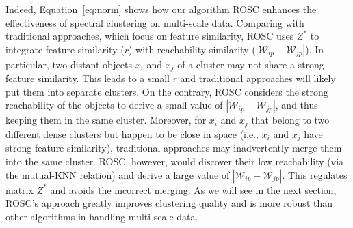 Indeed, Equation~\ref{eq:norm} shows how our algorithm ROSC enhances the effectiveness of 
spectral clustering on multi-scale data. 
Comparing with traditional approaches, which focus on feature similarity, ROSC uses $Z^*$
to integrate feature similarity  ($r$) with
reachability similarity ($|\mathcal{W}_{ip}-\mathcal{W}_{jp}|$).
In particular, two distant objects $x_i$ and $x_j$ of a cluster may not share a strong feature similarity.
This leads to a small $r$ and traditional approaches will likely put them into separate clusters.
On the contrary, ROSC considers the strong reachability of the objects
to derive a small value of $|\mathcal{W}_{ip}-\mathcal{W}_{jp}|$, and thus keeping them in the same cluster.
Moreover, for $x_i$ and $x_j$ that belong to two different dense clusters but happen to be close in 
space (i.e., $x_i$ and $x_j$ have strong feature similarity), 
traditional approaches may inadvertently merge them into the same cluster. 
ROSC, however, would discover their low reachability (via the mutual-KNN relation)
and derive a large value of $|\mathcal{W}_{ip}-\mathcal{W}_{jp}|$.
This regulates matrix $Z^*$ and avoids the incorrect merging.
As we will see in the next section, ROSC's approach 
greatly improves clustering quality and is more robust than other algorithms in handling
multi-scale data.
 
